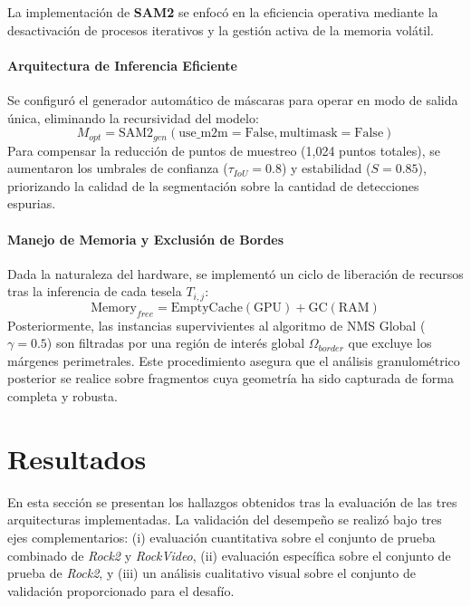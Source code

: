 La implementación de \textbf{SAM2} se enfocó en la eficiencia operativa mediante la desactivación de procesos iterativos y la gestión activa de la memoria volátil.

\paragraph{Arquitectura de Inferencia Eficiente}
Se configuró el generador automático de máscaras para operar en modo de salida única, eliminando la recursividad del modelo:
\begin{equation}
	M_{opt} = \text{SAM2}_{gen}(\text{use\_m2m} = \text{False}, \text{multimask} = \text{False})
\end{equation}
Para compensar la reducción de puntos de muestreo (1,024 puntos totales), se aumentaron los umbrales de confianza ($\tau_{IoU} = 0.8$) y estabilidad ($S = 0.85$), priorizando la calidad de la segmentación sobre la cantidad de detecciones espurias.

\paragraph{Manejo de Memoria y Exclusión de Bordes}
Dada la naturaleza del hardware, se implementó un ciclo de liberación de recursos tras la inferencia de cada tesela $T_{i,j}$:
\begin{equation}
	\text{Memory}_{free} = \text{EmptyCache}(\text{GPU}) + \text{GC}(\text{RAM})
\end{equation}
Posteriormente, las instancias supervivientes al algoritmo de NMS Global ($\gamma = 0.5$) son filtradas por una región de interés global $\Omega_{border}$ que excluye los márgenes perimetrales. Este procedimiento asegura que el análisis granulométrico posterior se realice sobre fragmentos cuya geometría ha sido capturada de forma completa y robusta.



\section{Resultados}

En esta sección se presentan los hallazgos obtenidos tras la evaluación de las tres arquitecturas implementadas. La validación del desempeño se realizó bajo tres ejes complementarios: (i) evaluación cuantitativa sobre el conjunto de prueba combinado de \textit{Rock2} y \textit{RockVideo}, (ii) evaluación específica sobre el conjunto de prueba de \textit{Rock2}, y (iii) un análisis cualitativo visual sobre el conjunto de validación proporcionado para el desafío.

